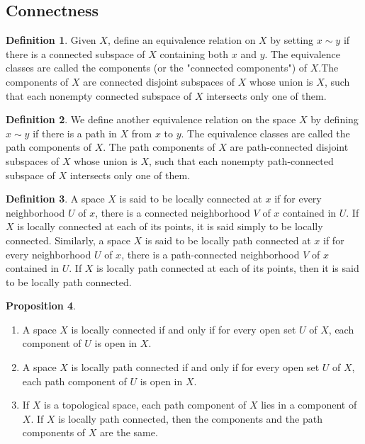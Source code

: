 \documentclass[12pt,a4paper]{book}
\newenvironment{enu}{\begin{enumerate}[(1)]}{\end{enumerate}}
\theoremstyle{definition}
\newtheorem{defn}{Definition}[section]
\newtheorem{prop}[defn]{Proposition}
\begin{document}
\subsection{Connectness}
\begin{defn}
    Given $X$, define an equivalence relation on $X$ by setting $x \sim y$ if there is a connected subspace of $X$ containing both $x$ and $y$. The equivalence classes are called the components (or the "connected components") of $X$.The components of $X$ are connected disjoint subspaces of $X$ whose union is $X$, such that each nonempty connected subspace of $X$ intersects only one of them.
\end{defn}
\begin{defn}
    We define another equivalence relation on the space $X$ by defining $x \sim y$ if there is a path in $X$ from $x$ to $y$. The equivalence classes are called the path components of $X$.
    The path components of $X$ are path-connected disjoint subspaces of $X$ whose union is $X$, such that each nonempty path-connected subspace of $X$ intersects only one of them.
\end{defn}
\begin{defn}
    A space $X$ is said to be locally connected at $x$ if for
    every neighborhood $U$ of $x$, there is a connected neighborhood $V$ of $x$ contained in $U$.
    If $X$ is locally connected at each of its points,
    it is said simply to be locally connected. Similarly, a space $X$ is said to be locally path connected
    at $x$ if for every neighborhood $U$ of $x$, there is a path-connected neighborhood $V$ of $x$ contained in $U$. If $X$ is locally path connected at each of its points, then it is said to be locally path connected.
\end{defn}
\begin{prop}
    \begin{enu}
        \item A space $X$ is locally connected if and only if for every open set $U$ of $X$, each component of $U$ is open in $X$.
        \item A space $X$ is locally path connected if and only if for every open set $U$ of $X$, each path component of $U$ is open in $X$.
        \item  If $X$ is a topological space, each path component of $X$ lies in a component of $X$. If $X$ is locally path connected, then the components and the path components of $X$ are the same.
    \end{enu}
\end{prop}
\end{document}
